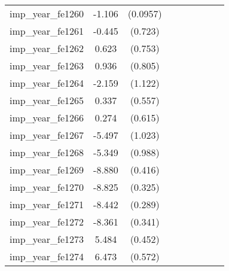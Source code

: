 {\begin{tabular}{l*{4}{cc}}
imp\_year\_fe1260&   -1.106\sym{***}& (0.0957)&                  &         &                  &         &                  &         \\
imp\_year\_fe1261&   -0.445         &  (0.723)&                  &         &                  &         &                  &         \\
imp\_year\_fe1262&    0.623         &  (0.753)&                  &         &                  &         &                  &         \\
imp\_year\_fe1263&    0.936         &  (0.805)&                  &         &                  &         &                  &         \\
imp\_year\_fe1264&   -2.159         &  (1.122)&                  &         &                  &         &                  &         \\
imp\_year\_fe1265&    0.337         &  (0.557)&                  &         &                  &         &                  &         \\
imp\_year\_fe1266&    0.274         &  (0.615)&                  &         &                  &         &                  &         \\
imp\_year\_fe1267&   -5.497\sym{***}&  (1.023)&                  &         &                  &         &                  &         \\
imp\_year\_fe1268&   -5.349\sym{***}&  (0.988)&                  &         &                  &         &                  &         \\
imp\_year\_fe1269&   -8.880\sym{***}&  (0.416)&                  &         &                  &         &                  &         \\
imp\_year\_fe1270&   -8.825\sym{***}&  (0.325)&                  &         &                  &         &                  &         \\
imp\_year\_fe1271&   -8.442\sym{***}&  (0.289)&                  &         &                  &         &                  &         \\
imp\_year\_fe1272&   -8.361\sym{***}&  (0.341)&                  &         &                  &         &                  &         \\
imp\_year\_fe1273&    5.484\sym{***}&  (0.452)&                  &         &                  &         &                  &         \\
imp\_year\_fe1274&    6.473\sym{***}&  (0.572)&                  &         &                  &         &                  &         \\

\end{tabular}}
